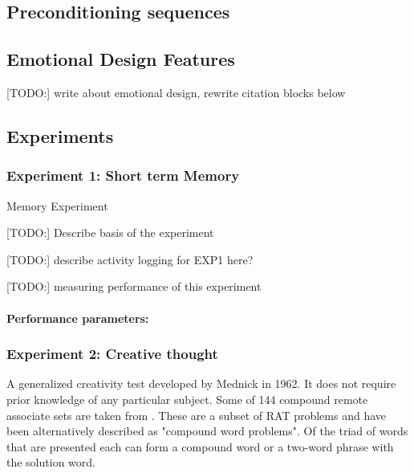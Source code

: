 	\subsection{Preconditioning sequences} \label{preconditioning}
	
	
	
	\subsection{Emotional Design Features}
	
	[TODO:] write about emotional design, rewrite citation blocks below
	
	
	
	\subsection{Experiments}

		\subsubsection{Experiment 1: Short term Memory} \label{sec:memory}
		
		Memory Experiment 
		
		[TODO:] Describe basis of the experiment
		
		[TODO:] describe activity logging for EXP1 here?
		
		[TODO:] measuring performance of this experiment
		
		\paragraph{Performance parameters:} \label{sec:memory-parameters}
		
		\subsubsection{Experiment 2: Creative thought} \label{sec:creativity}
		
		A generalized creativity test developed by Mednick \cite{Mednick1962} in 1962. It does not require prior knowledge of any particular subject. Some of 144 compound remote associate sets are taken from \cite{Bowden}. These are a subset of RAT problems and have been alternatively described as "compound word problems". Of the triad of words that are presented each can form a compound word or a two-word phrase with the solution word.
		
